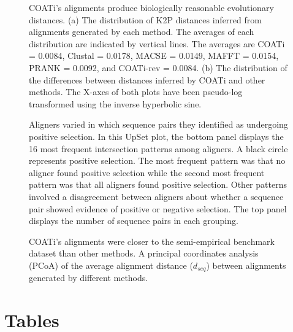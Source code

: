\documentclass[12pt,letterpaper]{article}
\begin{document}
\begin{figure}[ht]
    \centering%
    \par
    \caption{COATi's alignments produce biologically reasonable evolutionary distances. (a) The distribution of K2P distances inferred from alignments generated by each method. The averages of each distribution are indicated by vertical lines. The averages are COATi = 0.0084, Clustal\textOmega{} = 0.0178, MACSE = 0.0149, MAFFT = 0.0154, PRANK = 0.0092, and COATi-rev = 0.0084. (b) The distribution of the differences between distances inferred by COATi and other methods. The X-axes of both plots have been pseudo-log transformed using the inverse hyperbolic sine.\label{fig:k2p-empirical}}
\end{figure}

\begin{figure}[ht]
    \centering%
    \par
    \caption{Aligners varied in which sequence pairs they identified as undergoing positive selection.
    In this UpSet plot, the bottom panel displays the 16 most frequent intersection patterns among aligners. A black circle represents positive selection. The most frequent pattern was that no aligner found positive selection while the second most frequent pattern was that all aligners found positive selection. Other patterns involved a disagreement between aligners about whether a sequence pair showed evidence of positive or negative selection. The top panel displays the number of sequence pairs in each grouping.\label{fig:sel-empirical}}
\end{figure}

\begin{figure}[ht]
    \centering%
    \par
    \caption{COATi's alignments were closer to the semi-empirical benchmark dataset than other methods. A principal coordinates analysis (PCoA) of the average alignment distance ($d_{seq}$) between alignments generated by different methods.\label{fig:dseq-benchmarks}}
\end{figure}

\clearpage
\newpage
\section*{Tables}
\end{document}
